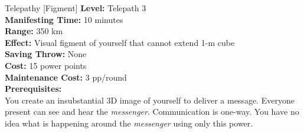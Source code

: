{Telepathy [Figment]}
{
	\textbf{Level:}
	Telepath 3\\
	\textbf{Manifesting Time:}
	10 minutes\\
	\textbf{Range:}
	350 km\\
	\textbf{Effect:}
	Visual figment of yourself that cannot extend 1-m cube\\
	\textbf{Saving Throw:}
	None\\
	\textbf{Cost:}
	15 power points\\
	\textbf{Maintenance Cost:}
	3 pp/round\\
	\textbf{Prerequisites:}
	\\
}
{
	You create an insubstantial 3D image of yourself to deliver a message. Everyone present can see and hear the \emph{messenger}. Communication is one-way. You have no idea what is happening around the \emph{messenger} using only this power.
}
